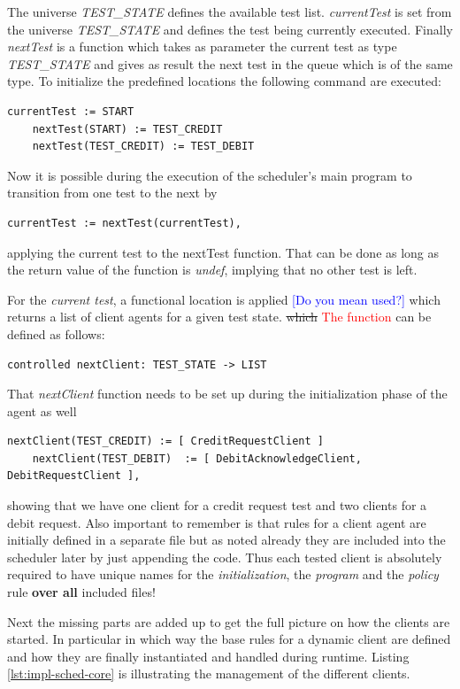 The universe \textit{TEST\_STATE} defines the available test list. \textit{currentTest} is set from the universe \textit{TEST\_STATE} and defines the test being currently executed. Finally \textit{nextTest} is a function which takes as parameter the current test as type \textit{TEST\_STATE} and gives as result the next test in the queue which is of the same type. To initialize the predefined locations the following command are executed:
\begin{lstlisting}[language=bsl]
	currentTest := START
	nextTest(START) := TEST_CREDIT
	nextTest(TEST_CREDIT) := TEST_DEBIT
\end{lstlisting}
Now it is possible during the execution of the scheduler's main program to transition from one test to the next by
\begin{lstlisting}[language=bsl]
	currentTest := nextTest(currentTest),
\end{lstlisting}
applying the current test to the nextTest function. That can be done as long as the return value of the function is \textit{undef}, implying that no other test is left.

For the \textit{current test}, a functional location is applied \textcolor{blue}{[Do you mean used?]}
which returns a list of client agents for a given test state.  \st{which} \textcolor{red}{The function} can be defined as follows:
\begin{lstlisting}[language=bsl]
	controlled nextClient: TEST_STATE -> LIST
\end{lstlisting}
That \textit{nextClient} function needs to be set up during the initialization phase of the agent as well
\begin{lstlisting}[language=bsl]
	nextClient(TEST_CREDIT) := [ CreditRequestClient ]
	nextClient(TEST_DEBIT)  := [ DebitAcknowledgeClient, DebitRequestClient ],
\end{lstlisting}
showing that we have one client for a credit request test and two clients for a debit request. Also important to remember is that rules for a client agent are initially defined in a separate file but as noted already they are included into the scheduler later by just appending the code. Thus each tested client is absolutely required to have unique names for the \textit{initialization}, the \textit{program} and the \textit{policy} rule \textbf{over all} included files!

Next the missing parts are added up to get the full picture on how the clients are started. In particular in which way the base rules for a dynamic client are defined and how they are finally instantiated and handled during runtime. Listing \ref{lst:impl-sched-core} is illustrating the management of the different clients.

